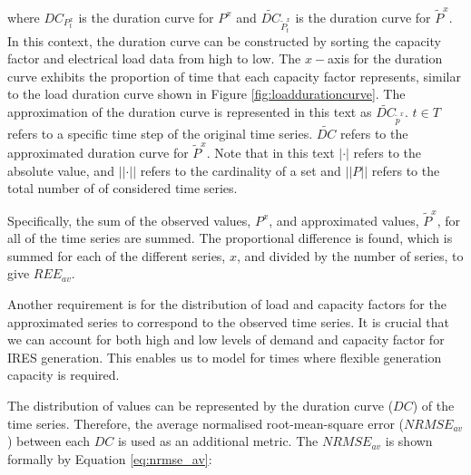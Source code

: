 \noindent where $DC_{P^x_t}$ is the duration curve for $P^x$ and $\widetilde{DC}_{\widetilde{P}^x_t}$ is the duration curve for $\widetilde{P}^x$. In this context, the duration curve can be constructed by sorting the capacity factor and electrical load data from high to low. The $x-$axis for the duration curve exhibits the proportion of time that each capacity factor represents, similar to the load duration curve shown in Figure \ref{fig:loaddurationcurve}. The approximation of the duration curve is represented in this text as $\widetilde{DC}_{\widetilde{p}^x}$. $t\in T$ refers to a specific time step of the original time series. $\widetilde{DC}$ refers to the approximated duration curve for $\widetilde{P}^x$. Note that in this text $\left|\cdot\right|$ refers to the absolute value, and $\left|\left|\cdot\right|\right|$ refers to the cardinality of a set and $\left|\left|P\right|\right|$ refers to the total number of of considered time series.

Specifically, the sum of the observed values, $P^x$, and approximated values, $\widetilde P^x$, for all of the time series are summed. The proportional difference is found, which is summed for each of the different series, $x$, and divided by the number of series, to give $REE_{av}$.







Another requirement is for the distribution of load and capacity factors for the approximated series to correspond to the observed time series. It is crucial that we can account for both high and low levels of demand and capacity factor for IRES generation. This enables us to model for times where flexible generation capacity is required.

The distribution of values can be represented by the duration curve ($DC$) of the time series. Therefore, the average normalised root-mean-square error ($NRMSE_{av}$) between each $DC$ is used as an additional metric. The $NRMSE_{av}$ is shown formally by Equation \ref{eq:nrmse_av}:

